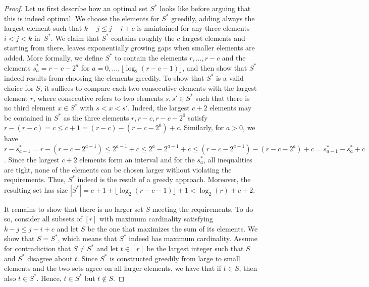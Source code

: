 \documentclass[10pt,a4paper]{amsart}
\begin{document}
\begin{proof}%
    Let us first describe how an optimal set $ S^* $ looks like before arguing that this is indeed optimal.
    We choose the elements for $ S^* $ greedily, adding always the largest element such that $ k - j \leq j - i + c $ is maintained for any three elements $ i < j < k $ in~$ S^* $.
    We claim that $ S^* $ contains roughly the $ c $ largest elements and starting from there, leaves exponentially growing gaps when smaller elements are added.
    More formally, we define $ S^* $ to contain the elements $ r, \dots, r - c $ and the elements $ s_a^* = r - c - 2^a $ for $ a = 0, \dots, \lfloor \log_2(r - c - 1) \rfloor $, and then show that $ S^* $ indeed results from choosing the elements greedily.
    To show that $ S^* $ is a valid choice for $ S $, it suffices to compare each two consecutive elements with the largest element $ r $, where consecutive refers to two elements $ s, s' \in S^* $ such that there is no third element $ x \in S^* $ with $ s < x < s' $.
    Indeed, the largest $ c + 2 $ elements may be contained in $ S^* $ as the three elements $ r, r-c, r - c - 2^0 $ satisfy $ r - (r - c) = c \leq c+1 = (r-c) - (r-c - 2^0) + c $.
    Similarly, for $ a > 0 $, we have 
    $ r - s_{a-1}^* 
    = r - (r - c - 2^{a-1}) 
    \leq 2^{a-1} + c
    \leq 2^{a} - 2^{a-1} + c
    \leq (r - c - 2^{a-1}) - (r - c - 2^{a}) + c
    = s_{a-1}^* - s_{a}^* + c$.
    Since the largest $ c + 2 $ elements form an interval and for the $ s_a^* $, all inequalities are tight, none of the elements can be chosen larger without violating the requirements.
    Thus, $ S^* $ indeed is the result of a greedy approach.
    Moreover, the resulting set has size $ |S^*| = c + 1 + \lfloor \log_2(r - c - 1) \rfloor + 1 < \log_2(r) + c + 2 $.

    It remains to show that there is no larger set $ S $ meeting the requirements. 
    To do so, consider all subsets of $ [r] $ with maximum cardinality satisfying $ k - j \leq j - i + c $ and let $ S $ be the one that maximizes the sum of its elements.
    We show that $ S = S^* $, which means that $ S^* $ indeed has maximum cardinality.
    Assume for contradiction that $S \neq S^*$ and let $ t \in [r] $ be the largest integer such that $ S $ and $ S^* $ disagree about $ t $. 
    Since $ S^* $ is constructed greedily from large to small elements and the two sets agree on all larger elements, we have that if $ t \in S $, then also $ t \in S^* $.
    Hence, $ t \in S^* $ but $ t \notin S $.
    

\end{proof}
\end{document}
